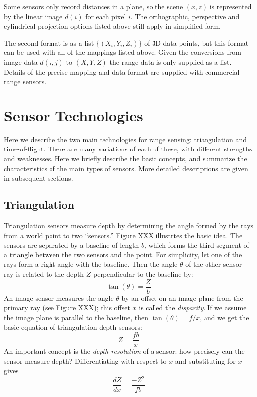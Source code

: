 \documentclass[twocolumn,oneside]{book}
\begin{document}
Some sensors only record distances in a plane, so the scene $(x,z)$ is
represented by the linear image $d(i)$ for each pixel $i$.
The orthographic, perspective and cylindrical projection options
listed above still apply in simplified form.

The second format is as a list $\{(X_i,Y_i,Z_i)\}$ of 3D data points,
but this format can be used with all of the mappings listed above.
Given the conversions from image data $d(i,j)$ to $(X,Y,Z)$ 
the range data is only supplied as a list.
Details of the precise mapping and data format are supplied with
commercial range sensors.

\section{Sensor Technologies}

Here we describe the two main technologies for range sensing:
triangulation and time-of-flight.  There are many variations of each
of these, with different strengths and weaknesses.  Here we briefly
describe the basic concepts, and summarize the characteristics of the
main types of sensors.  More detailed descriptions are given in
subsequent sections.

\subsection{Triangulation}

Triangulation sensors measure depth by determining the angle formed by
the rays from a world point to two ``sensors.''  Figure XXX illustrtes
the basic idea.  The sensors are separated by a baseline of length
$b$, which forms the third segment of a triangle between the two
sensors and the point.  For simplicity, let one of the rays form a
right angle with the baseline.  Then the angle $\theta$ of the other
sensor ray is related to the depth $Z$ perpendicular to the baseline
by:
\begin{equation}
 \tan(\theta) = \frac{Z}{b}
\label{eq31.angle-range}
\end{equation}
An image sensor measures the angle $\theta$ by an offset on an
image plane from the primary ray (see Figure XXX); this offset $x$ is
called the {\em disparity}.  If we assume the image plane is parallel
to the baseline, then $\tan(\theta) = f/x$, and we get the basic
equation of triangulation depth sensors:
\begin{equation}
 Z = \frac{fb}{x}
\label{eq31.disparity}
\end{equation}
An important concept is the {\em depth resolution} of a sensor: how
precisely can the sensor measure depth?  Differentiating with respect
to $x$ and substituting for $x$ gives 
\begin{equation}
 \frac{dZ}{dx} = \frac{-Z^2}{fb}
\label{eq31.disparity-resolution}
\end{equation}
\end{document}
